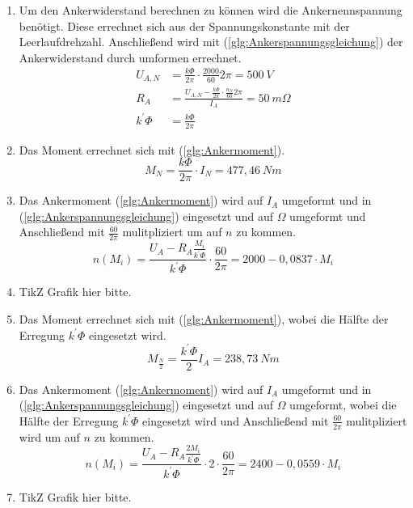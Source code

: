 \begin{solution}
\begin{enumerate}
\item Um den Ankerwiderstand berechnen zu können wird die Ankernennspannung benötigt. Diese errechnet sich aus der Spannungskonstante mit der Leerlaufdrehzahl. Anschließend wird mit (\ref{glg:Ankerspannungsgleichung}) der Ankerwiderstand durch umformen errechnet.\\
\begin{align}
U_{A,N} &= \frac{k \Phi}{2 \pi} \cdot \frac{2000}{60} 2 \pi = 500~V\\
R_A &= \frac{U_{A,N} - \frac{k \Phi}{2 \pi} \cdot \frac{n_N}{60} 2 \pi}{I_A}=50~m \Omega\\
k^{'}\Phi&= \frac{k \Phi}{2 \pi}
\end{align}
\item Das Moment errechnet sich mit (\ref{glg:Ankermoment}).\\
\begin{equation}
M_N=\frac{k \Phi}{2 \pi} \cdot I_N =477,46~Nm
\end{equation}
\item Das Ankermoment (\ref{glg:Ankermoment}) wird auf $I_A$ umgeformt und in (\ref{glg:Ankerspannungsgleichung}) eingesetzt und auf $\Omega$ umgeformt und Anschließend mit $\frac{60}{2 \pi}$ mulitpliziert um auf $n$ zu kommen.
\begin{equation}
n(M_i) = \frac{U_A - R_A \frac{M_i}{k^{'} \Phi}}{k^{'}\Phi} \cdot \frac{60}{2 \pi}=2000-0,0837 \cdot M_i
\end{equation}
\item TikZ Grafik hier bitte.
\item Das Moment errechnet sich mit (\ref{glg:Ankermoment}), wobei die Hälfte der Erregung $k^{'} \Phi$ eingesetzt wird.
\begin{equation}
M_{\frac{N}{2}} = \frac{k^{'}\Phi}{2} I_A =238,73~Nm
\end{equation}
\item Das Ankermoment (\ref{glg:Ankermoment}) wird auf $I_A$ umgeformt und in (\ref{glg:Ankerspannungsgleichung}) eingesetzt und auf $\Omega$ umgeformt, wobei die Hälfte der Erregung $k^{'} \Phi$ eingesetzt wird und Anschließend mit $\frac{60}{2 \pi}$ mulitpliziert wird um auf $n$ zu kommen.
\begin{equation}
n(M_i) = \frac{U_A - R_A \frac{2 M_i}{k^{'} \Phi}}{k^{'}\Phi} \cdot 2 \cdot \frac{60}{2 \pi} =2400-0,0559 \cdot M_i
\end{equation}
\item TikZ Grafik hier bitte.

\end{enumerate}
\end{solution}
